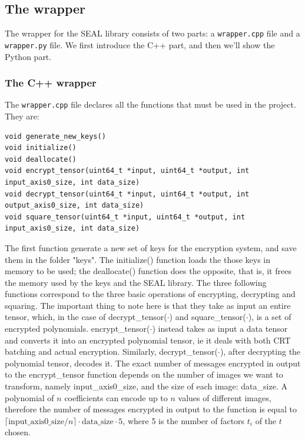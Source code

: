 \subsection{The wrapper}

The wrapper for the SEAL library consists of two parts: a \texttt{wrapper.cpp} file and a \texttt{wrapper.py} file. We first introduce the C++ part, and then we'll show the Python part.

\subsubsection{The C++ wrapper}

The \texttt{wrapper.cpp} file declares all the functions that must be used in the project. They are:


\begin{lstlisting}[frame=single]
void generate_new_keys()
void initialize()
void deallocate()
void encrypt_tensor(uint64_t *input, uint64_t *output, int input_axis0_size, int data_size)
void decrypt_tensor(uint64_t *input, uint64_t *output, int output_axis0_size, int data_size)
void square_tensor(uint64_t *input, uint64_t *output, int input_axis0_size, int data_size)
\end{lstlisting}

The first function generate a new set of keys for the encryption system, and save them in the folder "keys". The initialize() function loads the those keys in memory to be used; the deallocate() function does the opposite, that is, it frees the memory used by the keys and the SEAL library. The three following functions correspond to the three basic operations of encrypting, decrypting and squaring. The important thing to note here is that they take as input an entire tensor, which, in the case of decrypt_tensor($\cdot$) and square_tensor($\cdot$), is a set of encrypted polynomials. encrypt_tensor($\cdot$) instead takes as input a data tensor and converts it into an encrypted polynomial tensor, ie it deals with both CRT batching and actual encryption. Similarly, decrypt_tensor($\cdot$), after decrypting the polynomial tensor, decodes it. The exact number of messages encrypted in output to the encrypt_tensor function depends on the number of images we want to transform, namely input_axis0_size, and the size of each image: data_size. A polynomial of $n$ coefficients can encode up to $n$ values of different images, therefore the number of messages encrypted in output to the function is equal to $\lceil \text{input_axis0_size}/n\rceil\cdot\text{data_size}\cdot5$, where 5 is the number of factors $t_i$ of the $t$ chosen.

